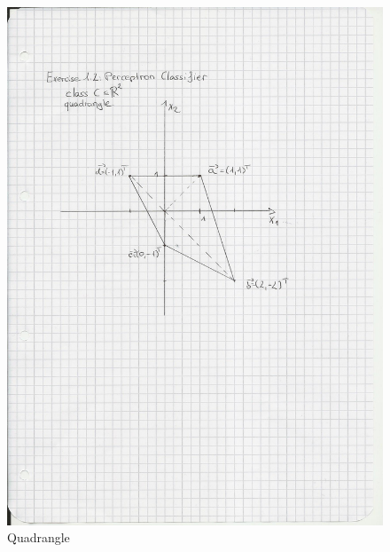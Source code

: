 \documentclass{scrartcl}
\begin{document}
\begin{figure}[ht]
\begin{center}
\includegraphics[scale=0.7]{Attachment3.jpg}
\end{center}
\caption{Quadrangle}
\label{Img:Exercise 1.2}
\end{figure}
\end{document}
